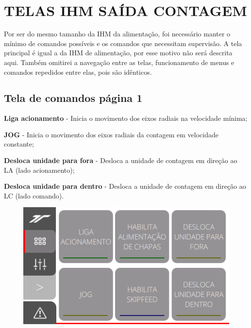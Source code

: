 \thispagestyle{fancy}
\vspace*{40 pt}
\section{\large{\MakeUppercase{Telas IHM saída contagem}}}
 Por ser do mesmo tamanho da IHM da alimentação, foi necessário manter o mínimo de comandos possíveis e os comandos que necessitam supervisão.
 A tela principal é igual a da IHM de alimentação, por esse motivo não será descrita aqui. Também omitirei a navegação entre as telas, funcionamento de menus
 e comandos repedidos entre elas, pois são idênticos.

\subsection{Tela de comandos página 1}\label{telaComandosSaidaContagem}

\begin{commandsInCount}
  \item[\ding{\dingNumber}] \textbf{Liga acionamento} - Inicia o movimento dos eixos radiais na velocidade mínima;
  \item[\ding{\dingNumber}] \textbf{JOG} - Inicia o movimento dos eixos radiais da contagem em velocidade constante;
  \item[\ding{\dingNumber}] \textbf{Desloca unidade para fora} - Desloca a unidade de contagem em direção ao LA (lado acionamento);
  \item[\ding{\dingNumber}] \textbf{Desloca unidade para dentro} - Desloca a unidade de contagem em direção ao LC (lado comando).
\end{commandsInCount}

\vspace*{\fill}
\begin{figure}[h]
  \centering
  \includegraphics{src/imagesFlexo/12-IHMCNT/e-2.png}
\end{figure}
\vspace*{\fill}

